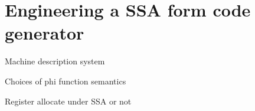 \section{Engineering a SSA form code generator}

Machine description system

Choices of phi function semantics

Register allocate under SSA or not




